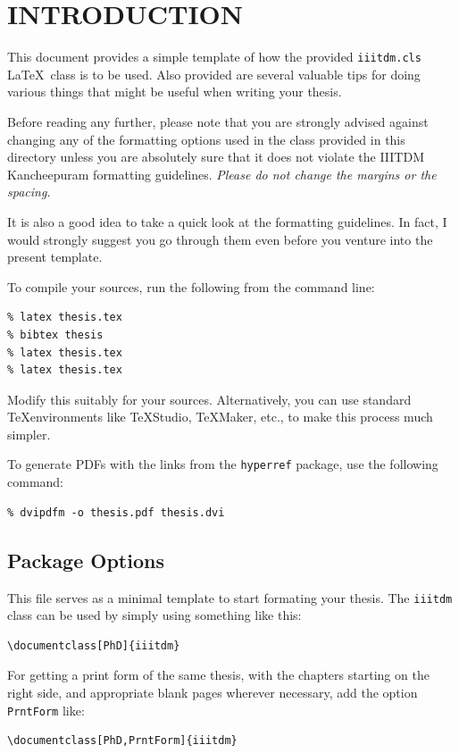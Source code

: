 \chapter{INTRODUCTION}
\label{chap:intro}

This document provides a simple template of how the provided \verb+iiitdm.cls+ \LaTeX\ class is to be used.  Also provided are several valuable tips for doing various things that might be useful when
writing your thesis. 

Before reading any further, please note that you are strongly advised against changing any of the formatting options used in the class provided in this directory unless you are absolutely sure that it
does not violate the IIITDM Kancheepuram formatting guidelines. \emph{Please do not change the margins or the spacing.}   

It is also a good idea to take a quick look at the formatting guidelines. In fact, I would strongly suggest you go through them even before you venture into the present template. 

To compile your sources, run the following from the command line:
\begin{verbatim}
% latex thesis.tex
% bibtex thesis
% latex thesis.tex
% latex thesis.tex
\end{verbatim}
Modify this suitably for your sources. Alternatively, you can use standard \TeX environments like \TeX Studio, \TeX Maker, etc., to make this process much simpler.

To generate PDFs with the links from the \verb+hyperref+ package, use the following command:
\begin{verbatim}
% dvipdfm -o thesis.pdf thesis.dvi
\end{verbatim}

\section{Package Options}
This file serves as a minimal template to start formating your thesis. The \verb+iiitdm+ class can be used by simply using something like this:
\begin{verbatim}
\documentclass[PhD]{iiitdm}  
\end{verbatim}

For getting a print form of the same thesis, with the chapters starting on the right side, and appropriate blank pages wherever necessary, add the option \verb+PrntForm+ like:
\begin{verbatim}
\documentclass[PhD,PrntForm]{iiitdm}  
\end{verbatim}

